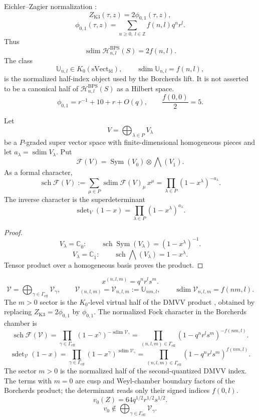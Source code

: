 \documentclass[11pt]{memoir}
\newcommand{\Z}{\mathbb{Z}} \newcommand{\C}{\mathbb{C}}
\newcommand{\sdim}{\operatorname{sdim}}
\newcommand{\sch}{\operatorname{sch}}
\newcommand{\sdet}{\operatorname{sdet}}
\begin{document}
\begin{definition}
Eichler--Zagier normalization \cite{EZ:1}:
$$Z_{\mathrm{K3}}(\tau,z)=2\phi_{0,1}(\tau,z),$$
$$\phi_{0,1}(\tau,z)
=\sum_{n\geq 0,\;l\in\Z}f(n,l)q^nr^l.$$
Thus
$$\sdim\mathcal H^{\mathrm{BPS}}_{n,l}(S)=2f(n,l).$$
The class
$$\mathbb U_{n,l}\in K_0(\mathrm{sVect}_{\mathrm{fd}}),
\qquad \sdim\mathbb U_{n,l}=f(n,l),$$
is the normalized half-index object used by the Borcherds lift.  It is
not asserted to be a canonical half of
$\mathcal H^{\mathrm{BPS}}_{n,l}(S)$ as a Hilbert space.
$$\phi_{0,1}=r^{-1}+10+r+O(q),\qquad
\frac{f(0,0)}{2}=5.$$
\end{definition}

\begin{lemma}
Let
$$V=\bigoplus_{\lambda\in P}V_\lambda$$
be a $P$-graded super vector space with finite-dimensional homogeneous
pieces and let $a_\lambda=\sdim V_\lambda$.  Put
$$\mathcal F(V)=\operatorname{Sym}(V_{\overline 0})
\otimes \bigwedge(V_{\overline 1}).$$
As a formal character,
$$\sch\mathcal F(V):=
\sum_{\mu\in P}\sdim\mathcal F(V)_\mu\,x^\mu
=\prod_{\lambda\in P}(1-x^\lambda)^{-a_\lambda}.$$
The inverse character is the superdeterminant
$$\sdet_V(1-x)=\prod_{\lambda\in P}(1-x^\lambda)^{a_\lambda}.$$
\end{lemma}

\begin{proof}
$$V_\lambda=\C_{\overline0}:\qquad
\sch\operatorname{Sym}(V_\lambda)=(1-x^\lambda)^{-1}.$$
$$V_\lambda=\C_{\overline1}:\qquad
\sch\bigwedge(V_\lambda)=1-x^\lambda.$$
Tensor product over a homogeneous basis proves the product.
\end{proof}

$$x^{(n,l,m)}=q^nr^ls^m.$$
$$\mathcal V=\bigoplus_{\gamma\in\Gamma_{\mathrm{eff}}}\mathcal V_\gamma,
\qquad
\mathcal V_{(n,l,m)}=\mathcal V_{n,l,m}:=\mathbb U_{nm,l},\qquad
\sdim\mathcal V_{n,l,m}=f(nm,l).$$
The $m>0$ sector is the $K_0$-level virtual half of the DMVV product
\cite{DMVV}, obtained by replacing
$Z_{\mathrm{K3}}=2\phi_{0,1}$ by $\phi_{0,1}$.  The normalized Fock
character in the Borcherds chamber is
$$\sch\mathcal F(\mathcal V)
=\prod_{\gamma\in\Gamma_{\mathrm{eff}}}(1-x^\gamma)^{-\sdim\mathcal V_\gamma}
=\prod_{(n,l,m)\in\Gamma_{\mathrm{eff}}}
(1-q^nr^ls^m)^{-f(nm,l)}.$$
$$\sdet_{\mathcal V}(1-x)
=\prod_{\gamma\in\Gamma_{\mathrm{eff}}}(1-x^\gamma)^{\sdim\mathcal V_\gamma}
=\prod_{(n,l,m)\in\Gamma_{\mathrm{eff}}}
(1-q^nr^ls^m)^{f(nm,l)}.$$
The sector $m>0$ is the normalized half of the second-quantized DMVV
index.  The terms with $m=0$ are cusp and Weyl-chamber boundary factors
of the Borcherds product; the determinant reads only their signed
indices $f(0,l)$.
$$v_0(Z)=64q^{1/2}r^{1/2}s^{1/2}.$$
$$v_0\notin\bigoplus_{\gamma\in\Gamma_{\mathrm{eff}}}\mathcal V_\gamma.$$
\end{document}
